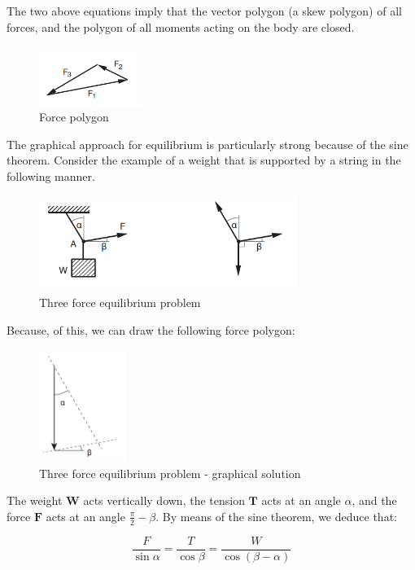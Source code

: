 \documentclass{article}
\begin{document}
The two above equations imply that the vector polygon (a skew polygon) of all forces, and the polygon of all moments acting on the body are closed.

\begin{figure}[h]
    \centering
    \includegraphics[width = 0.3\textwidth]{images/force_polygon.png}
    \caption{Force polygon}
    \label{fig:force-polygon}
\end{figure}

\begin{example}
    The graphical approach for equilibrium is particularly strong because of the sine theorem. Consider the example of a weight that is supported by a string in the following manner.
    
    \begin{figure}[h]
    \centering
    \includegraphics[width = 0.75\textwidth]{images/ex1.png}
    \caption{Three force equilibrium problem}
    \label{fig:ex-1}
    \end{figure}

    Because, of this, we can draw the following force polygon:

    \begin{figure}[h]
    \centering
    \includegraphics[width = 0.25\textwidth]{images/ex_2.png}
    \caption{Three force equilibrium problem - graphical solution}
    \label{fig:ex-2}
    \end{figure}

    The weight $\mathbf{W}$ acts vertically down, the tension $\mathbf{T}$ acts at an angle $\alpha$, and the force $\mathbf{F}$ acts at an angle $\frac{\pi}{2} - \beta$. By means of the sine theorem, we deduce that:

    \[ \frac{F}{\sin{\alpha}} = \frac{T}{\cos{\beta}} = \frac{W}{\cos{(\beta - \alpha)}} \]
\end{example}
\end{document}
